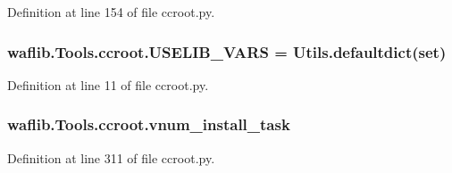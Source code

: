 Definition at line 154 of file ccroot.\+py.

\subsubsection[{\texorpdfstring{U\+S\+E\+L\+I\+B\+\_\+\+V\+A\+RS}{USELIB_VARS}}]{\setlength{\rightskip}{0pt plus 5cm}waflib.\+Tools.\+ccroot.\+U\+S\+E\+L\+I\+B\+\_\+\+V\+A\+RS = {\bf Utils.\+defaultdict}(set)}\hypertarget{namespacewaflib_1_1_tools_1_1ccroot_afb22745532c5000bf45eb62d52d3168e}{}\label{namespacewaflib_1_1_tools_1_1ccroot_afb22745532c5000bf45eb62d52d3168e}


Definition at line 11 of file ccroot.\+py.

\subsubsection[{\texorpdfstring{vnum\+\_\+install\+\_\+task}{vnum_install_task}}]{\setlength{\rightskip}{0pt plus 5cm}waflib.\+Tools.\+ccroot.\+vnum\+\_\+install\+\_\+task}\hypertarget{namespacewaflib_1_1_tools_1_1ccroot_a1a4e673dcd88f117178d3a9bf3d87e4c}{}\label{namespacewaflib_1_1_tools_1_1ccroot_a1a4e673dcd88f117178d3a9bf3d87e4c}


Definition at line 311 of file ccroot.\+py.

